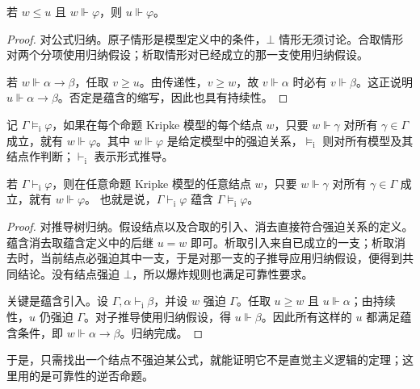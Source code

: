 \documentclass[lang=cn,a4paper,fontset=none,zihao=false,10pt,openany,twoside]{beautybook}
\numberwithin{algorithm}{chapter}
\begin{document}
\begin{readingmaterial}[title={阅读材料：Kripke 语义},title after break={阅读材料：Kripke 语义（续）}]
\begin{lemma}[持续性]\label{lem:kripke-persistence}
若 $w\leq u$ 且 $w\Vdash\varphi$，则 $u\Vdash\varphi$。
\end{lemma}
\begin{proof}
对公式归纳。原子情形是模型定义中的条件，$\bot$ 情形无须讨论。合取情形对两个分项使用归纳假设；析取情形对已经成立的那一支使用归纳假设。

若 $w\Vdash\alpha\to\beta$，任取 $v\geq u$。由传递性，$v\geq w$，故 $v\Vdash\alpha$ 时必有 $v\Vdash\beta$。这正说明 $u\Vdash\alpha\to\beta$。否定是蕴含的缩写，因此也具有持续性。
\end{proof}

\begin{definition}
记 $\Gamma\models_{\mathrm i}\varphi$，如果在每个命题 Kripke 模型的每个结点 $w$，只要 $w\Vdash\gamma$ 对所有 $\gamma\in\Gamma$ 成立，就有 $w\Vdash\varphi$。其中 $w\Vdash\varphi$ 是给定模型中的强迫关系，$\models_{\mathrm i}$ 则对所有模型及其结点作判断；$\vdash_{\mathrm i}$ 表示形式推导。
\end{definition}

\begin{theorem}\label{thm:kripke-sound}
若 $\Gamma\vdash_{\mathrm i}\varphi$，则在任意命题 Kripke 模型的任意结点 $w$，只要 $w\Vdash\gamma$ 对所有 $\gamma\in\Gamma$ 成立，就有 $w\Vdash\varphi$。
也就是说，$\Gamma\vdash_{\mathrm i}\varphi$ 蕴含 $\Gamma\models_{\mathrm i}\varphi$。
\end{theorem}
\begin{proof}
对推导树归纳。假设结点以及合取的引入、消去直接符合强迫关系的定义。蕴含消去取蕴含定义中的后继 $u=w$ 即可。析取引入来自已成立的一支；析取消去时，当前结点必强迫其中一支，于是对那一支的子推导应用归纳假设，便得到共同结论。没有结点强迫 $\bot$，所以爆炸规则也满足可靠性要求。

关键是蕴含引入。设 $\Gamma,\alpha\vdash_{\mathrm i}\beta$，并设 $w$ 强迫 $\Gamma$。任取 $u\geq w$ 且 $u\Vdash\alpha$；由持续性，$u$ 仍强迫 $\Gamma$。对子推导使用归纳假设，得 $u\Vdash\beta$。因此所有这样的 $u$ 都满足蕴含条件，即 $w\Vdash\alpha\to\beta$。归纳完成。
\end{proof}
于是，只需找出一个结点不强迫某公式，就能证明它不是直觉主义逻辑的定理；这里用的是可靠性的逆否命题。


\end{readingmaterial}
\end{document}
